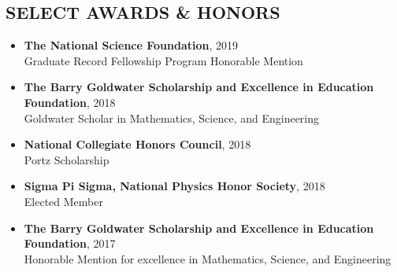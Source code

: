 \documentclass[margin, 10pt]{res} %
\begin{document}
\begin{resume}
 


\section{SELECT AWARDS \& HONORS}
\begin{itemize}
    \item \textbf{{\scriptsize The National Science Foundation}}, {\small 2019}\\Graduate Record Fellowship Program Honorable Mention
	\item \textbf{{\scriptsize The Barry Goldwater Scholarship and Excellence in Education Foundation}}, {\small 2018}\\Goldwater Scholar in Mathematics, Science, and Engineering 
    \item {\scriptsize \textbf{National Collegiate Honors Council}}, {\small 2018}\\Portz Scholarship
    \item \textbf{{\scriptsize Sigma Pi Sigma, National Physics Honor Society}}, {\small 2018}\\Elected Member
    \item \textbf{{\scriptsize The Barry Goldwater Scholarship and Excellence in Education Foundation}}, {\small 2017}\\Honorable Mention for excellence in Mathematics, Science, and Engineering 
\end{itemize}


\end{resume}
\end{document}
